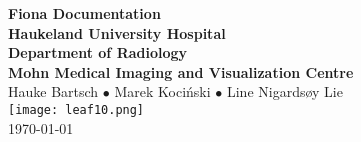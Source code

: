 

\begin{titlepage}
\centering
\vspace*{2cm}

{\fontsize{36}{40}\selectfont\bfseries Fiona Documentation}\\[2.5cm]

{\fontsize{20}{24}\selectfont\bfseries Haukeland University Hospital}\\[1.5cm]
{\fontsize{16}{20}\selectfont\bfseries Department of Radiology}\\[0.6cm] 
{\fontsize{16}{20}\selectfont\bfseries Mohn Medical Imaging and Visualization Centre}\\[2cm]

{\large Hauke Bartsch \quad $\bullet$ \quad Marek Koci\'nski \quad $\bullet$ \quad Line Nigardsøy Lie}\\[3cm]

\texttt{[image: leaf10.png]}\\[1cm]

\vfill
{\large \today}
\end{titlepage}
